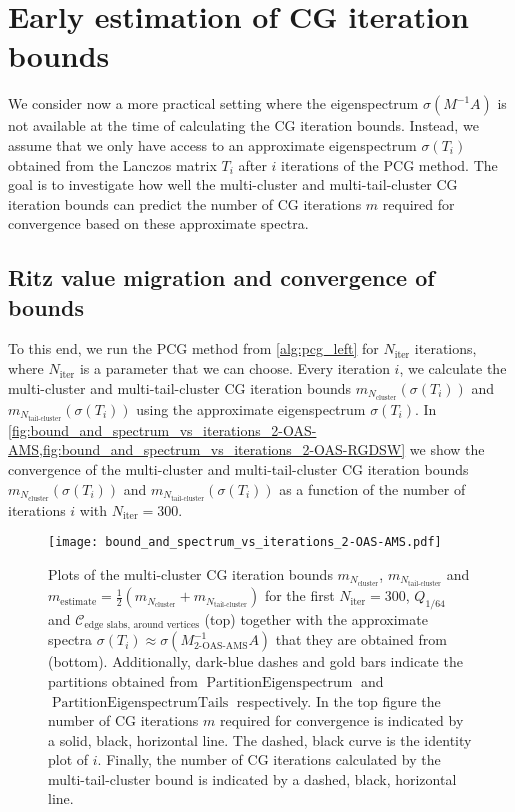 \section{Early estimation of CG iteration bounds}\label{sec:early_estimation_of_iterations}
We consider now a more practical setting where the eigenspectrum $\sigma(M^{-1}A)$ is not available at the time of calculating the CG iteration bounds. Instead, we assume that we only have access to an approximate eigenspectrum $\sigma(T_i)$ obtained from the Lanczos matrix $T_i$ after $i$ iterations of the PCG method. The goal is to investigate how well the multi-cluster and multi-tail-cluster CG iteration bounds can predict the number of CG iterations $m$ required for convergence based on these approximate spectra.

\subsection{Ritz value migration and convergence of bounds}\label{sec:ritz_value_migration}
To this end, we run the PCG method from \cref{alg:pcg_left} for $N_{\text{iter}}$ iterations, where $N_{\text{iter}}$ is a parameter that we can choose. Every iteration $i$, we calculate the multi-cluster and multi-tail-cluster CG iteration bounds $m_{N_{\text{cluster}}}(\sigma(T_i))$ and $m_{N_{\text{tail-cluster}}}(\sigma(T_i))$ using the approximate eigenspectrum $\sigma(T_i)$. In \cref{fig:bound_and_spectrum_vs_iterations_2-OAS-AMS,fig:bound_and_spectrum_vs_iterations_2-OAS-RGDSW} we show the convergence of the multi-cluster and multi-tail-cluster CG iteration bounds $m_{N_{\text{cluster}}}(\sigma(T_i))$ and $m_{N_{\text{tail-cluster}}}(\sigma(T_i))$ as a function of the number of iterations $i$ with $N_{\text{iter}}=300$.
\begin{figure}[H]
    \centering
    \texttt{[image: bound\_and\_spectrum\_vs\_iterations\_2-OAS-AMS.pdf]}
    \caption{Plots of the multi-cluster CG iteration bounds $m_{N_{\text{cluster}}}$, $m_{N_{\text{tail-cluster}}}$ and $m_{\text{estimate}} = \frac{1}{2}(m_{N_{\text{cluster}}} + m_{N_{\text{tail-cluster}}})$ for the first $N_{\text{iter}}=300$, $Q_{1/64}$ and $\mathcal{C}_{\text{edge slabs, around vertices}}$ (top) together with the approximate spectra $\sigma(T_i) \approx \sigma(M^{-1}_{\text{2-OAS-AMS}}A)$ that they are obtained from (bottom). Additionally, dark-blue dashes and gold bars indicate the partitions obtained from $\operatorname{PartitionEigenspectrum}$ and $\operatorname{PartitionEigenspectrumTails}$ respectively. In the top figure the number of CG iterations $m$ required for convergence is indicated by a solid, black, horizontal line. The dashed, black curve is the identity plot of $i$. Finally, the number of CG iterations calculated by the multi-tail-cluster bound is indicated by a dashed, black, horizontal line.}
    \label{fig:bound_and_spectrum_vs_iterations_2-OAS-AMS}
\end{figure}
